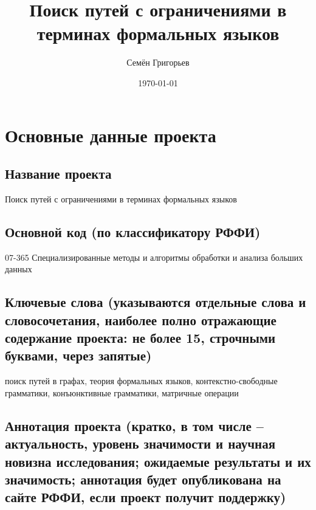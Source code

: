 \documentclass[12pt]{article}  %
\title{Поиск путей с ограничениями в терминах формальных языков}
\author{Семён Григорьев}
\date{\today}
\theoremstyle{remark}
\begin{document}

\maketitle

\section{Основные данные проекта}

\subsection{Название проекта}
Поиск путей с ограничениями в терминах формальных языков

\subsection{Основной код (по классификатору РФФИ)}
07-365 Специализированные методы и алгоритмы обработки и анализа больших данных

\subsection{Ключевые слова (указываются отдельные слова и словосочетания, наиболее полно отражающие содержание проекта: не более 15, строчными буквами, через запятые)}
поиск путей в графах, теория формальных языков, контекстно-свободные грамматики, конъюнктивные грамматики, матричные операции

\subsection{Аннотация проекта (кратко, в том числе – актуальность, уровень значимости и научная новизна исследования; ожидаемые результаты и их значимость; аннотация будет опубликована на сайте РФФИ, если проект получит поддержку)}
\end{document}
